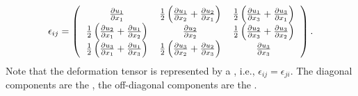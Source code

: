 \[
\epsilon_{ij}=
\left(\begin{tabular}{ccc}\centering
$\frac{\partial u_1}{\partial x_1}$  & 
$\frac{1}{2}\left(\frac{\partial u_1}{\partial x_2}+\frac{\partial u_2}{\partial x_1}\right)$  &  
$\frac{1}{2}\left(\frac{\partial u_1}{\partial x_3}+\frac{\partial u_3}{\partial x_1}\right)$ \\
$\frac{1}{2}\left(\frac{\partial u_2}{\partial x_1}+\frac{\partial u_1}{\partial x_2}\right)$  & 
$\frac{\partial u_2}{\partial x_2}$  &  
$\frac{1}{2}\left(\frac{\partial u_2}{\partial x_3}+\frac{\partial u_3}{\partial x_2}\right)$ \\
$\frac{1}{2}\left(\frac{\partial u_3}{\partial x_1}+\frac{\partial u_1}{\partial x_3}\right)$  & 
$\frac{1}{2}\left(\frac{\partial u_3}{\partial x_2}+\frac{\partial u_2}{\partial x_3}\right)$  &  
$\frac{\partial u_3}{\partial x_3}$ 
\end{tabular}\right).
\]
Note that the deformation tensor is represented by a , i.e., $\epsilon_{ij}=\epsilon_{ji}$.
The diagonal components are the , the off-diagonal components are the .


